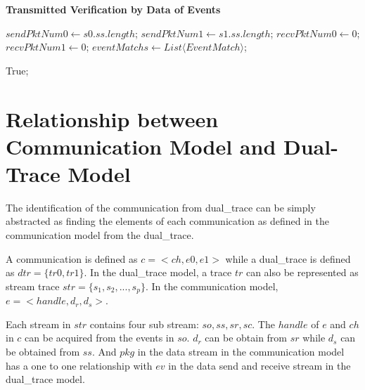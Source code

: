 \begin{algorithm}[H]
\DontPrintSemicolon
\caption{{\bf Transmitted Verification by Data of Events } \label{dataAlg2}}
\;
$sendPktNum0 \leftarrow s0.ss.length$;\;
$sendPktNum1 \leftarrow s1.ss.length$;\;
$recvPktNum0 \leftarrow 0$;\;
$recvPktNum1 \leftarrow 0$;\;
$eventMatchs \leftarrow List \langle EventMatch \rangle$;\;



 \KwRet True;\;
\end{algorithm}

\section{Relationship between Communication Model and Dual-Trace Model}
The identification of the communication from dual\_trace can be simply abstracted as finding the elements of each communication as defined in the communication model from the dual\_trace. 

A communication is defined as $c =<ch, e0, e1>$ while a dual\_trace is defined as $dtr = \lbrace tr0, tr1\rbrace$. In the dual\_trace model, a trace $tr$ can also be represented as stream trace $str = \lbrace s_1, s_2, ..., s_p\rbrace$. In the communication model, $ e =<handle, d_r, d_s>$. 

Each stream in $str$ contains four sub stream: $so, ss, sr, sc$.  The $handle$ of $e$ and $ch$ in $c$ can be acquired from the events in $so$. $d_r$ can be obtain from $sr$ while $d_s$ can be obtained from $ss$. And $pkg$ in the data stream in the communication model has a one to one relationship with $ev$ in the data send and receive stream in the dual\_trace model.

